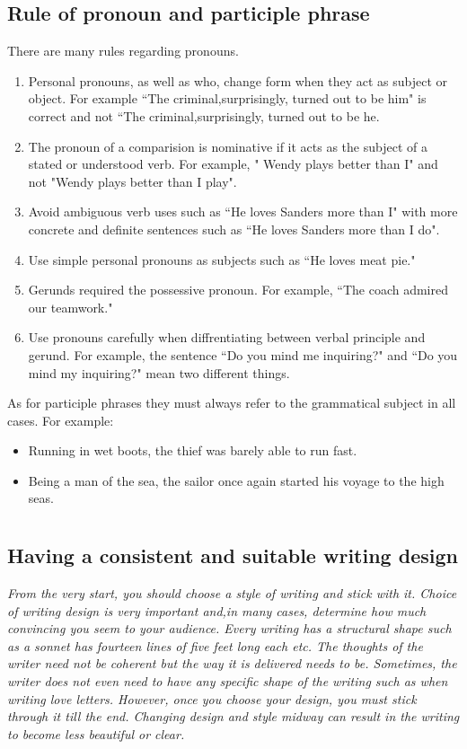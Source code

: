 \documentclass{report}
\begin{document}
\section{Rule of pronoun and participle phrase}
There are many rules regarding pronouns.
\begin{enumerate}
\item Personal pronouns, as well as who, change form when they act as subject or object. For example ``The criminal,surprisingly, turned out to be him" is correct and not ``The criminal,surprisingly, turned out to be he.
\item The pronoun of a comparision is nominative if it acts as the subject of a stated or understood verb. For example, " Wendy plays better than I" and not "Wendy plays better than I play".
\item Avoid ambiguous verb uses such as ``He loves Sanders more than I" with more concrete and definite sentences such as ``He loves Sanders more than I do".
\item Use simple personal pronouns as subjects such as ``He loves meat pie."
\item Gerunds required the possessive pronoun. For example, ``The coach admired our teamwork."
\item Use pronouns carefully when diffrentiating between verbal principle and gerund. For example, the sentence ``Do you mind me inquiring?" and ``Do you mind my inquiring?" mean two different things.
\end{enumerate}
As for participle phrases they must always refer to the grammatical subject in all cases. For example:
\begin{itemize}
\item Running in wet boots, the thief was barely able to run fast.
\item Being a man of the sea, the sailor once again started his voyage to the high seas.
\end{itemize}
\newpage




\chapter{}\label{chap:cr}


\section{Having a consistent and suitable writing design}\label{sec:sr}
{
\em
From the very start, you should choose a style of writing and stick with it. Choice of writing design is very important and,in many cases, determine how much convincing you seem to your audience. Every writing has a structural shape such as a sonnet has fourteen lines of five feet long each etc. The thoughts of the writer need not be coherent but the way it is delivered needs to be. Sometimes, the writer does not even need to have any specific shape of the writing such as when writing love letters. However, once you choose your design, you must stick through it till the end. Changing design and style midway can result in the writing to become less beautiful or clear.
}
\end{document}
